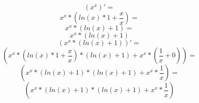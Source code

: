 \documentclass[a4paper,12pt]{article}
\begin{document}
\begin{equation}
\left( {x }^ {x }\right)' =
\end{equation}
\begin{equation}
{{x }^ {x }}* {\left( {{ln \left( {x }\right) }* {1 }}+ {\frac{{x }}{{x }}}\right) }=
\end{equation}
\begin{equation}
{{x }^ {x }}* {\left( {ln \left( {x }\right) }+ {1 }\right) }=
\end{equation}
\begin{equation}
{{x }^ {x }}* {\left( {ln \left( {x }\right) }+ {1 }\right) }
\end{equation}
\begin{equation}
\left( {{x }^ {x }}* {\left( {ln \left( {x }\right) }+ {1 }\right) }\right)' =
\end{equation}
\begin{equation}
\left( {{{{x }^ {x }}* {\left( {{ln \left( {x }\right) }* {1 }}+ {\frac{{x }}{{x }}}\right) }}* {\left( {ln \left( {x }\right) }+ {1 }\right) }}+ {{{x }^ {x }}* {\left( {\frac{{1 }}{{x }}}+ {0 }\right) }}\right) =
\end{equation}
\begin{equation}
\left( {{{{x }^ {x }}* {\left( {ln \left( {x }\right) }+ {1 }\right) }}* {\left( {ln \left( {x }\right) }+ {1 }\right) }}+ {{{x }^ {x }}* {\frac{{1 }}{{x }}}}\right) =
\end{equation}
\begin{equation}
\left( {{{{x }^ {x }}* {\left( {ln \left( {x }\right) }+ {1 }\right) }}* {\left( {ln \left( {x }\right) }+ {1 }\right) }}+ {{{x }^ {x }}* {\frac{{1 }}{{x }}}}\right) 
\end{equation}
\end{document}
